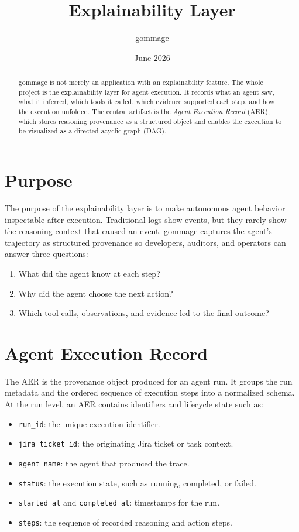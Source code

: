 \documentclass[11pt,a4paper]{article}
\title{\textbf{Explainability Layer}}
\author{gommage}
\date{June 2026}
\begin{document}
\maketitle

\begin{abstract}
gommage is not merely an application with an explainability feature. The whole
project is the explainability layer for agent execution. It records what an
agent saw, what it inferred, which tools it called, which evidence supported
each step, and how the execution unfolded. The central artifact is the
\emph{Agent Execution Record} (AER), which stores reasoning provenance as a
structured object and enables the execution to be visualized as a directed
acyclic graph (DAG).
\end{abstract}

\section{Purpose}

The purpose of the explainability layer is to make autonomous agent behavior
inspectable after execution. Traditional logs show events, but they rarely show
the reasoning context that caused an event. gommage captures the agent's
trajectory as structured provenance so developers, auditors, and operators can
answer three questions:

\begin{enumerate}[leftmargin=1.5em]
  \item What did the agent know at each step?
  \item Why did the agent choose the next action?
  \item Which tool calls, observations, and evidence led to the final outcome?
\end{enumerate}

\section{Agent Execution Record}

The AER is the provenance object produced for an agent run. It groups the run
metadata and the ordered sequence of execution steps into a normalized schema.
At the run level, an AER contains identifiers and lifecycle state such as:

\begin{itemize}[leftmargin=1.5em]
  \item \texttt{run\_id}: the unique execution identifier.
  \item \texttt{jira\_ticket\_id}: the originating Jira ticket or task context.
  \item \texttt{agent\_name}: the agent that produced the trace.
  \item \texttt{status}: the execution state, such as running, completed, or failed.
  \item \texttt{started\_at} and \texttt{completed\_at}: timestamps for the run.
  \item \texttt{steps}: the sequence of recorded reasoning and action steps.
\end{itemize}
\end{document}
